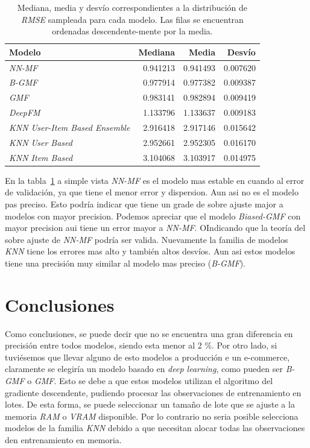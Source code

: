 \documentclass[11pt,a4paper,twoside]{thesis}
\begin{document}
\begin{table}[!htb]
	\centering
	\footnotesize
	\begin{tabular}{lrrr}
		\hline
		Modelo                                & Mediana  & Media    & Desvío   \\
		\hline
		\textit{NN-MF}                        & 0.941213 & 0.941493 & 0.007620 \\
		\textit{B-GMF}                        & 0.977914 & 0.977382 & 0.009387 \\
		\textit{GMF}                          & 0.983141 & 0.982894 & 0.009419 \\
		\textit{DeepFM}                       & 1.133796 & 1.133637 & 0.009183 \\
		\textit{KNN User-Item Based Ensemble} & 2.916418 & 2.917146 & 0.015642 \\
		\textit{KNN User Based}               & 2.952661 & 2.952305 & 0.016170 \\
		\textit{KNN Item Based}               & 3.104068 & 3.103917 & 0.014975 \\
		\hline
	\end{tabular}
	\caption{
		Mediana, media y desvío correspondientes a la distribución de
		\textit{RMSE} sampleada para cada modelo. Las filas se encuentran ordenadas  descendente-mente por la media.
	}
	\label{table:rmse}
\end{table}

En la tabla~\ref{table:rmse} a simple vista \textit{NN-MF} es el modelo mas
estable en cuando al error de validación, ya que tiene el menor error y
dispersion. Aun asi no es el modelo pas preciso. Esto podría indicar que tiene
un grade de sobre ajuste major a modelos con mayor precision. Podemos apreciar
que el modelo \textit{Biased-GMF} con mayor precision aui tiene un error mayor
a \textit{NN-MF}. OIndicando que la teoría del sobre ajuste de \textit{NN-MF}
podría ser valida. Nuevamente la familia de modelos \textit{KNN} tiene los
errores mas alto y también altos desvíos. Aun asi estos modelos tiene una
precisión muy similar al modelo mas preciso (\textit{B-GMF}).

\chapter{Conclusiones}

Como conclusiones, se puede decir que no se encuentra una gran diferencia en
precisión entre todos modelos, siendo esta menor al 2 \%. Por otro lado, si
tuviésemos que llevar alguno de esto modelos a producción e un e-commerce,
claramente se elegiría un modelo basado en \textit{deep learning}, como pueden
ser \textit{B-GMF} o \textit{GMF}. Esto se debe a que estos modelos utilizan el
algoritmo del gradiente descendente, pudiendo procesar las observaciones de
entrenamiento en lotes. De esta forma, se puede seleccionar un tamaño de lote
que se ajuste a la memoria \textit{RAM} o \textit{VRAM} disponible. Por lo
contrario no seria posible selecciona modelos de la familia \textit{KNN} debido
a que necesitan alocar todas las observaciones den entrenamiento en memoria.
\end{document}
